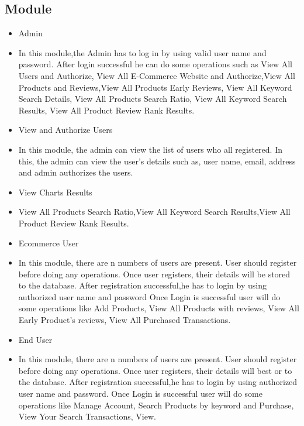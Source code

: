 \documentclass[oneside,a4paper,12pt]{report}
\begin{document}
\subsection{Module}   
\begin{itemize}
 
\item {Admin}
\item In this module,the Admin has to log in by using valid user name and password. After login successful he can do some operations such as View All Users and Authorize, View All E-Commerce Website and Authorize,View All Products and Reviews,View All Products Early Reviews, View All Keyword Search Details, View All Products Search Ratio, View All Keyword Search Results, View All Product Review Rank Results.\\

\item {View and Authorize Users}
\item In this module, the admin can view the list of users who all registered. In this, the admin can view the user’s details such as, user name, email, address and admin authorizes the users.\\

\item {View Charts Results}
\item View All Products Search Ratio,View All Keyword Search Results,View All Product Review Rank Results.\\

\item {Ecommerce User}
\item In this module, there are n numbers of users are present. User should register before doing any operations. Once user registers, their details will be stored to the database. After registration successful,he has to login by using authorized user name and password Once Login is successful user will do some operations like Add Products, View All Products with reviews, View All Early Product’s reviews, View All Purchased Transactions.\\
\item {End User}
\item In this module, there are n numbers of users are present. User should register before doing any operations. Once user registers, their details will best or to the database. After registration successful,he has to login by using authorized user name and password. Once Login is successful user will do some operations like Manage Account, Search Products by keyword and Purchase, View Your Search Transactions, View.\\
 
\end{itemize}
\end{document}
